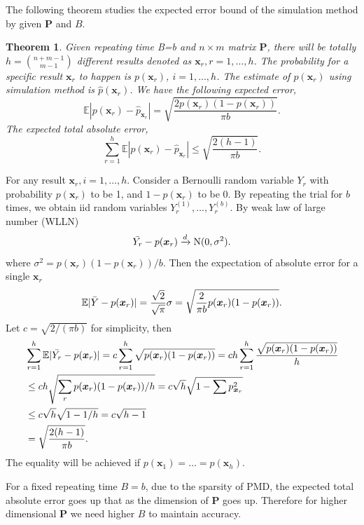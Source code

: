 \documentclass[12pt]{article}
\newcommand{\EE}{\mathbb{E}}
\newcommand{\Pmat}{\mathbf{P}}
\newcommand{\PMD}{\textrm{PMD}}
\newcommand{\wh}{\widehat}
\newcommand{\xvec}{\boldsymbol{x}}
\newtheorem{thm}{Theorem}
\begin{document}
The following theorem studies the expected error bound of the simulation method by given $\Pmat$ and $B$.
\begin{thm}
Given repeating time \mbox{B}=b and $n \times m$ matrix $\Pmat$, there will be totally  $h=\binom{n+m-1}{m-1}$ different results denoted as $\xvec_r, r=1,\dots,h$. The probability for a specific result $\xvec_{r}$ to happen is $p(\xvec_{r})$, $i=1,\dots,h$. The estimate of  $p(\xvec_r)$ using simulation method is $\wh{p}(\xvec_r)$. We have the following expected error,
\begin{equation*}
    \EE|p(\xvec_r) - \wh{p}_{\xvec_r}| =  \sqrt{\frac{2 p(\xvec_r)(1-p(\xvec_r))}{\pi b}}.
\end{equation*}
The expected total absolute error,
$$\sum_{r=1}^{h} \EE|p(\xvec_r) - \wh{p}_{\xvec_r}| \leq \sqrt{\frac{2(h-1)}{\pi b}}.$$
\end{thm}

For any result $\xvec_r,i=1,\dots,h$. Consider a Bernoulli random variable $Y_r$ with probability $p(\xvec_r)$ to be 1, and $1-p(\xvec_r)$ to be 0. By repeating the trial for $b$ times, we obtain iid random variables $Y_r^{(1)},\dots,Y_r^{(b)}$. By weak law of large number (WLLN)
\begin{equation*}
    \Bar{Y_r}-p(\xvec_r) \xrightarrow{d} \textrm{N}(0,\sigma^2).
\end{equation*}
where $\sigma^2 = p(\xvec_r)(1-p(\xvec_r))/b$. Then the expectation of absolute error for a single $\xvec_r$
\begin{equation*}
    \EE |\Bar{Y}-p(\xvec_r)| = \frac{\sqrt{2}}{\sqrt{\pi}}\sigma = \sqrt{\frac{2}{\pi b}p(\xvec_r)(1-p(\xvec_r))}.
\end{equation*}
Let $c = \sqrt{2/(\pi b)}$ for simplicity, then
\begin{align*}
    & \sum_{r=1}^{h}\EE |\Bar{Y_r}-p(\xvec_r)| = c \sum_{r=1}^{h} \sqrt{p(\xvec_r)(1-p(\xvec_r))}  = c h \sum_{r=1}^{h}\frac{\sqrt{p(\xvec_r)(1-p(\xvec_r))}}{h} \\
    & \leq c h \sqrt{\sum_{r}p(\xvec_r)(1-p(\xvec_r))/h} = c \sqrt{h} \sqrt{1-\sum p_{\xvec_{r}}^2}\\ &\leq c \sqrt{h} \sqrt{1-1/h} = c\sqrt{h-1}\\
    & = \sqrt{\frac{2(h-1)}{\pi b}}.
\end{align*}
The equality will be achieved if $p(\xvec_1) = \dots = p(\xvec_h)$. 

For a fixed repeating time $B=b$, due to the sparsity of $\PMD$, the expected total absolute error goes up that as the dimension of $\Pmat$ goes up. Therefore for higher dimensional $\Pmat$ we need higher $B$ to maintain accuracy.
\end{document}
